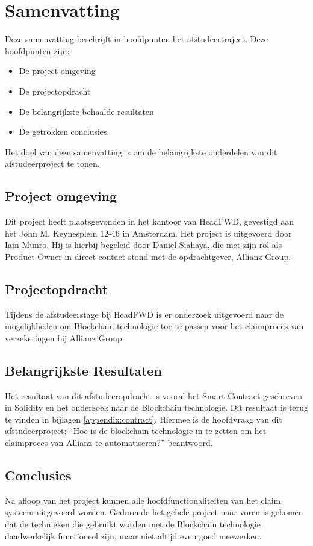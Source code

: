 \chapter{Samenvatting}
Deze samenvatting beschrijft in hoofdpunten het afstudeertraject. Deze hoofdpunten zijn:
\begin{itemize} 
	\item De project omgeving
	\item De projectopdracht
	\item De belangrijkste behaalde resultaten
	\item De getrokken conclusies.
\end{itemize}
Het doel van deze samenvatting is om de belangrijkste onderdelen van dit afstudeerproject te tonen.

\section{Project omgeving}
Dit project heeft plaatsgevonden in het kantoor van HeadFWD, gevestigd aan het John M. Keynesplein 12-46 in Amsterdam. Het project is uitgevoerd door Iain Munro. Hij is hierbij begeleid door Daniël Siahaya, die met zijn rol als Product Owner in direct contact stond met de opdrachtgever, Allianz Group.

\section{Projectopdracht}
Tijdens de afstudeerstage bij HeadFWD is er onderzoek uitgevoerd naar de mogelijkheden om Blockchain technologie toe te passen voor het claimproces van verzekeringen bij Allianz Group.

\section{Belangrijkste Resultaten}
Het resultaat van dit afstudeeropdracht is vooral het Smart Contract geschreven in Solidity en het onderzoek naar de Blockchain technologie. Dit resultaat is terug te vinden in bijlagen \ref{appendix:contract}. Hiermee is de hoofdvraag van dit afstudeerproject: “Hoe is de blockchain technologie in te zetten om het claimproces van Allianz te automatiseren?” beantwoord.
\newpage

\section{Conclusies}
Na afloop van het project kunnen alle hoofdfunctionaliteiten van het claim systeem uitgevoerd worden. Gedurende het gehele project naar voren is gekomen dat de technieken die gebruikt worden met de Blockchain technologie daadwerkelijk functioneel zijn, maar niet altijd even goed meewerken.\par

